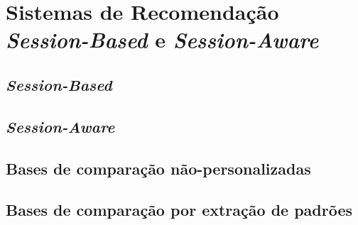 \section{Sistemas de Recomendação \textit{Session-Based} e \textit{Session-Aware}}
\subsection{\textit{Session-Based}}
\subsection{\textit{Session-Aware}}
\subsection{Bases de comparação não-personalizadas}
\subsection{Bases de comparação por extração de padrões}
